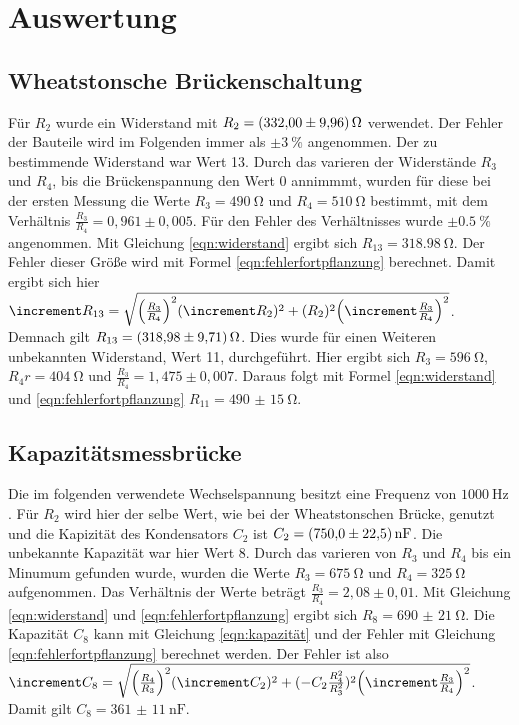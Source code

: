 \section{Auswertung}
\label{sec:Auswertung}

\subsection{Wheatstonsche Brückenschaltung}
Für $R_2$ wurde ein Widerstand mit $R_2=\qty{332(9,96)}{\ohm}$ verwendet.
Der Fehler der Bauteile wird im Folgenden immer als $\pm\qty{3}{\percent}$ angenommen.
Der zu bestimmende Widerstand war Wert 13.
Durch das varieren der Widerstände $R_3$ und $R_4$, bis die Brückenspannung den Wert 0 annimmmt, wurden für diese bei der ersten Messung die Werte
$R_3=\qty{490}{\ohm}$ und $R_4=\qty{510}{\ohm}$ bestimmt, mit dem Verhältnis $\frac{R_3}{R_4}=0,961\pm0,005$.
Für den Fehler des Verhältnisses wurde $\pm\qty{0,5}{\percent}$ angenommen.
Mit Gleichung \ref{eqn:widerstand} ergibt sich $R_{13}=\qty{318,98}{\ohm}$.
Der Fehler dieser Größe wird mit Formel \ref{eqn:fehlerfortpflanzung} berechnet.
Damit ergibt sich hier $\increment R_{13}=\sqrt{ \Bigl(\frac{R_3}{R_4}\Bigr)^2 (\increment R_2)^2+(R_2)^2 \Bigl(\increment \frac{R_3}{R_4}\Bigr)^2}$.
Demnach gilt $R_{13}=\qty{318,98(9,71)}{\ohm}$.
Dies wurde für einen Weiteren unbekannten Widerstand, Wert 11, durchgeführt.
Hier ergibt sich $R_3=\qty{596}{\ohm}$, $R_4r=\qty{404}{\ohm}$ und $\frac{R_3}{R_4}=1,475\pm0,007$.
Daraus folgt mit Formel \ref{eqn:widerstand} und \ref{eqn:fehlerfortpflanzung} $R_{11}=\qty{490(15)}{\ohm}$.



\subsection{Kapazitätsmessbrücke}
Die im folgenden verwendete Wechselspannung besitzt eine Frequenz von $\qty{1000}{\hertz}$.
Für $R_2$ wird hier der selbe Wert, wie bei der Wheatstonschen Brücke, genutzt und die Kapizität des Kondensators $C_2$ ist $C_2=\qty{750(22,5)}{\nano\farad}$.
Die unbekannte Kapazität war hier Wert 8.
Durch das varieren von $R_3$ und $R_4$ bis ein Minumum gefunden wurde, wurden die Werte $R_3=\qty{675}{\ohm}$ und $R_4=\qty{325}{\ohm}$ aufgenommen.
Das Verhältnis der Werte beträgt $\frac{R_3}{R_4}=2,08\pm0,01$. 
Mit Gleichung \ref{eqn:widerstand} und \ref{eqn:fehlerfortpflanzung} ergibt sich $R_8=\qty{690(21)}{\ohm}$.
Die Kapazität $C_8$ kann mit Gleichung \ref{eqn:kapazität} und der Fehler mit Gleichung \ref{eqn:fehlerfortpflanzung} berechnet werden.
Der Fehler ist also $\increment C_{8}=\sqrt{ \Bigl(\frac{R_4}{R_3}\Bigr)^2 (\increment C_2)^2+(-C_2 \frac{R_4^2}{R_3^2})^2 \Bigl(\increment \frac{R_3}{R_4}\Bigr)^2}$.
Damit gilt $C_8=\qty{361(11)}{\nano\farad}$.\\

